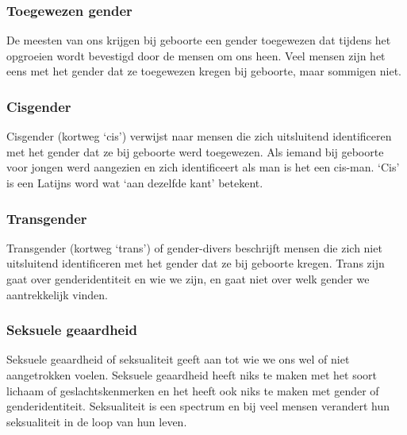 \documentclass[12pt,openany]{book}
\begin{document}
\subsubsection*{Toegewezen gender}

De meesten van ons krijgen bij geboorte een gender toegewezen dat tijdens het opgroeien wordt bevestigd door de mensen om ons heen. Veel mensen zijn het eens met het gender dat ze toegewezen kregen bij geboorte, maar sommigen niet.  

\subsubsection*{Cisgender}

Cisgender (kortweg `cis') verwijst naar mensen die zich uitsluitend identificeren met het gender dat ze bij geboorte werd toegewezen. Als iemand bij geboorte voor jongen werd aangezien en zich identificeert als man is het een cis-man. `Cis' is een Latijns word wat `aan dezelfde kant' betekent. 

\begin{figure}[h]
    \centering
\end{figure}

\subsubsection*{Transgender} 

Transgender (kortweg `trans') of gender-divers beschrijft mensen die zich niet uitsluitend identificeren met het gender dat ze bij geboorte kregen. Trans zijn gaat over genderidentiteit en wie we zijn, en gaat niet over welk gender we aantrekkelijk vinden.

\subsubsection*{Seksuele geaardheid} 

Seksuele geaardheid of seksualiteit geeft aan tot wie we ons wel of niet aangetrokken voelen. Seksuele geaardheid heeft niks te maken met het soort lichaam of geslachtskenmerken en het heeft ook niks te maken met gender of genderidentiteit. Seksualiteit is een spectrum en bij veel mensen verandert hun seksualiteit in de loop van hun leven.
\end{document}
